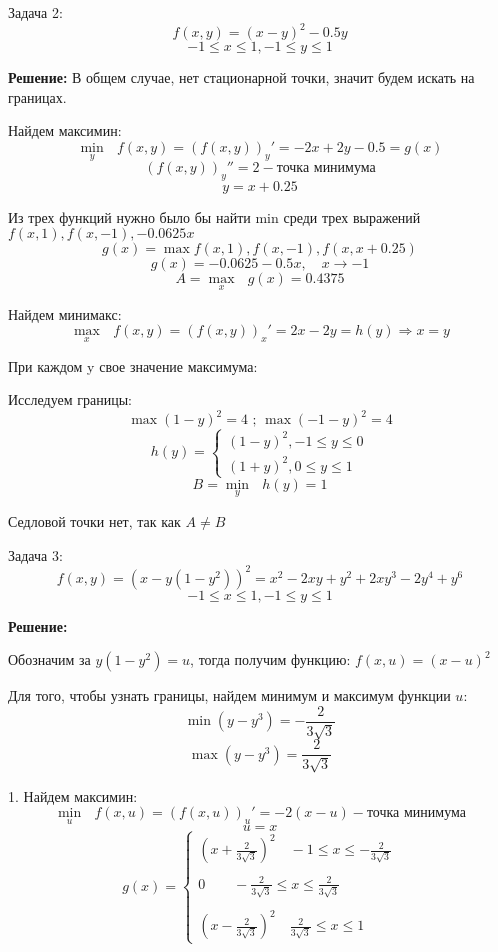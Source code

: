 \documentclass[aps,%
12pt,%
final,%
oneside,
onecolumn,%
musixtex, %
superscriptaddress,%
centertags]{article} %
\begin{document}
Задача 2:
$$ f(x,y) = (x-y)^2 - 0.5y $$
$$ -1 \leq x \leq 1,-1 \leq y \leq 1 $$

\textbf{Решение:}
В общем случае, нет стационарной точки, значит будем искать на границах.

Найдем максимин:
$$ \underset{y}{\min} \text{ } f(x,y) = (f(x,y))_y'  = -2x + 2y -0.5 = g(x)$$
$$(f(x,y))_y'' = 2  -\text{точка минимума}$$ 
$$ y = x + 0.25$$

Из трех функций нужно было бы найти min среди трех выражений $f(x,1),f(x,-1),-0.0625x$
$$g(x) = \max{f(x,1),f(x,-1),f(x,x+0.25)}$$
$$ g(x) = -0.0625 - 0.5 x,\quad  x\to -1 $$
$$ A = \underset{x}{\max} \text{ } g(x) = 0.4375 $$

Найдем минимакс:
$$ \underset{x}{\max} \text{ } f(x,y) = (f(x,y))_x'  = 2x -  2y = h(y) \Rightarrow x = y$$

При каждом y свое значение максимума:

Исследуем границы:
$$ \max (1-y)^2 = 4 \text{ ;  } \max (-1-y)^2 = 4 $$
$$h(y) = \left\{\begin{matrix}
(1-y)^2, -1 \leq y \leq 0\\ 
(1+y)^2, 0 \leq y \leq 1
\end{matrix}\right.$$
$$ B = \underset{y}{\min} \text{ } h(y) = 1 $$

Седловой точки нет, так как $A \neq B$

Задача 3:
$$ f(x,y) = (x-y(1-y^2))^2 = x^2 - 2 x y + y^2 + 2 x y^3 - 2 y^4 + y^6$$
$$ -1 \leq x \leq 1,-1 \leq y \leq 1 $$

\textbf{Решение:}

Обозначим за $y(1-y^2) = u$, тогда получим функцию: $f(x,u) = (x-u)^2$

Для того, чтобы узнать границы, найдем минимум и максимум функции $u$:
$$ \min (y - y^3) =-\frac{2}{3\sqrt3}$$
$$ \max (y - y^3) = \frac{2}{3\sqrt3}$$

1. Найдем максимин:
$$ \underset{u}{\min} \text{ } f(x,u) = (f(x,u))_u'  = -2(x-u) - \text{точка минимума}$$
$$u=x$$
$$g(x) = \left \{
\begin{matrix}
(x+\frac{2}{3\sqrt3})^2 \quad -1 \leq x \leq -\frac{2}{3\sqrt3} \\
{}\\
  0 \qquad -\frac{2}{3\sqrt3} \leq x \leq \frac{2}{3\sqrt3} \\
{} \\
(x-\frac{2}{3\sqrt3})^2 \quad \frac{2}{3\sqrt3 } \leq x \leq 1
\end{matrix}\right.$$
\end{document}
